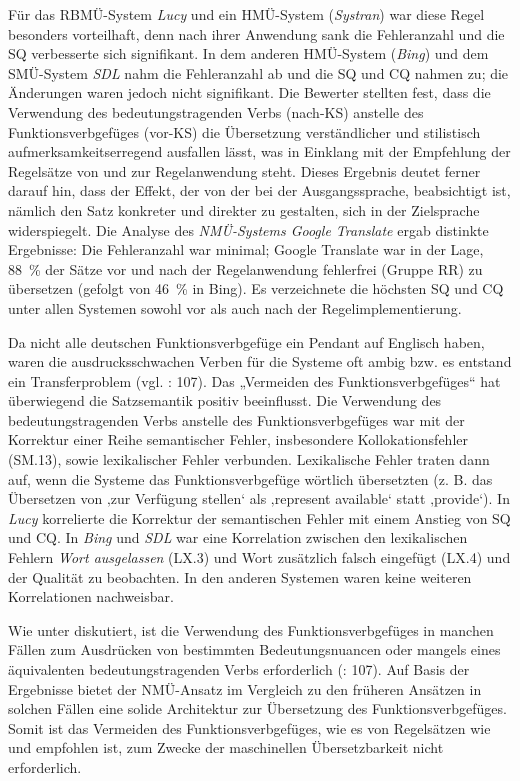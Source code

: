 Für das RBMÜ-System \textit{Lucy} und ein HMÜ-System (\textit{Systran}) war diese Regel besonders vorteilhaft, denn nach ihrer Anwendung sank die Fehleranzahl und die SQ verbesserte sich signifikant. In dem anderen HMÜ-System (\textit{Bing}) und dem SMÜ-System \textit{SDL} nahm die Fehleranzahl ab und die SQ und CQ nahmen zu; die Änderungen waren jedoch nicht signifikant. Die Bewerter stellten fest, dass die Verwendung des bedeutungstragenden Verbs (nach-KS) anstelle des Funktionsverbgefüges (vor-KS) die Übersetzung verständlicher und stilistisch aufmerksamkeitserregend ausfallen lässt, was in Einklang mit der Empfehlung der Regelsätze von \citet{Congree2018} und \citet{Siegel2011} zur Regelanwendung steht. Dieses Ergebnis deutet ferner darauf hin, dass der Effekt, der von der \citet[107]{tekom2013} bei der Ausgangssprache, beabsichtigt ist, nämlich den Satz konkreter und direkter zu gestalten, sich in der Zielsprache widerspiegelt. Die Analyse des \textit{NMÜ-Systems Google Translate} ergab distinkte Ergebnisse: Die Fehleranzahl war minimal; Google Translate war in der Lage, 88~\% der Sätze vor und nach der Regelanwendung fehlerfrei (Gruppe RR) zu übersetzen (gefolgt von 46~\% in Bing). Es verzeichnete die höchsten SQ und CQ unter allen Systemen sowohl vor als auch nach der Regelimplementierung.

Da nicht alle deutschen Funktionsverbgefüge ein Pendant auf Englisch haben, waren die ausdrucksschwachen Verben für die Systeme oft ambig bzw. es entstand ein Transferproblem (vgl. \citealt{BaumertVerhein-Jarren2012}: 107). Das „Vermeiden des Funktionsverbgefüges“ hat überwiegend die Satzsemantik positiv beeinflusst. Die Verwendung des bedeutungstragenden Verbs anstelle des Funktionsverbgefüges war mit der Korrektur einer Reihe semantischer Fehler, insbesondere Kollokationsfehler (SM.13), sowie lexikalischer Fehler verbunden. Lexikalische Fehler traten dann auf, wenn die Systeme das Funktionsverbgefüge wörtlich übersetzten (z. B. das Übersetzen von ‚zur Verfügung stellen‘ als ‚represent available‘ statt ‚provide‘). In \textit{Lucy} korrelierte die Korrektur der semantischen Fehler mit einem Anstieg von SQ und CQ. In \textit{Bing} und \textit{SDL} war eine Korrelation zwischen den lexikalischen Fehlern \textit{Wort ausgelassen} (LX.3) und Wort zusätzlich falsch eingefügt (LX.4) und der Qualität zu beobachten. In den anderen Systemen waren keine weiteren Korrelationen nachweisbar.

\largerpage%
Wie unter  diskutiert, ist die Verwendung des Funktionsverbgefüges in manchen Fällen zum Ausdrücken von bestimmten Bedeutungsnuancen oder mangels eines äquivalenten bedeutungstragenden Verbs erforderlich (\citealt{BaumertVerhein-Jarren2012}: 107). Auf Basis der Ergebnisse bietet der NMÜ-Ansatz im Vergleich zu den früheren Ansätzen in solchen Fällen eine solide Architektur zur Übersetzung des Funktionsverbgefüges. Somit ist das Vermeiden des Funktionsverbgefüges, wie es von Regelsätzen wie \citet{Congree2018} und \citet{Siegel2011} empfohlen ist, zum Zwecke der maschinellen Übersetzbarkeit nicht erforderlich.

